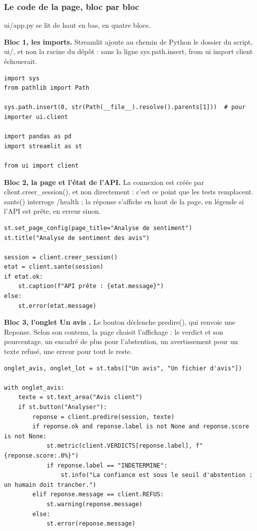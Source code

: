 \documentclass[11pt,a4paper]{article}
\newcommand{\co}[1]{{\ttfamily\hyphenchar\font=45\relax #1}}
\begin{document}
\subsubsection{Le code de la page, bloc par bloc}

\co{ui/app.py} se lit de haut en bas, en quatre blocs.

\textbf{Bloc 1, les imports.} Streamlit ajoute au chemin de Python le dossier du script, \co{ui/}, et non la
racine du dépôt : sans la ligne \co{sys.path.insert}, \co{from ui import client} échouerait.

\begin{lstlisting}[basicstyle=\ttfamily\footnotesize]
import sys
from pathlib import Path

sys.path.insert(0, str(Path(__file__).resolve().parents[1]))  # pour importer ui.client

import pandas as pd
import streamlit as st

from ui import client
\end{lstlisting}

\textbf{Bloc 2, la page et l'état de l'API.} La connexion est créée par \co{client.creer\_session()}, et
non directement : c'est ce point que les tests remplacent. \co{sante()} interroge \co{/health} ; la réponse
s'affiche en haut de la page, en légende si l'API est prête, en erreur sinon.

\begin{lstlisting}[basicstyle=\ttfamily\footnotesize]
st.set_page_config(page_title="Analyse de sentiment")
st.title("Analyse de sentiment des avis")

session = client.creer_session()
etat = client.sante(session)
if etat.ok:
    st.caption(f"API prête : {etat.message}")
else:
    st.error(etat.message)
\end{lstlisting}

\textbf{Bloc 3, l'onglet \og Un avis \fg{}.} Le bouton déclenche \co{predire()}, qui renvoie une
\co{Reponse}. Selon son contenu, la page choisit l'affichage : le verdict et son pourcentage, un encadré de
plus pour l'abstention, un avertissement pour un texte refusé, une erreur pour tout le reste.

\begin{lstlisting}[basicstyle=\ttfamily\footnotesize]
onglet_avis, onglet_lot = st.tabs(["Un avis", "Un fichier d'avis"])

with onglet_avis:
    texte = st.text_area("Avis client")
    if st.button("Analyser"):
        reponse = client.predire(session, texte)
        if reponse.ok and reponse.label is not None and reponse.score is not None:
            st.metric(client.VERDICTS[reponse.label], f"{reponse.score:.0%}")
            if reponse.label == "INDETERMINE":
                st.info("La confiance est sous le seuil d'abstention : un humain doit trancher.")
        elif reponse.message == client.REFUS:
            st.warning(reponse.message)
        else:
            st.error(reponse.message)
\end{lstlisting}
\end{document}
